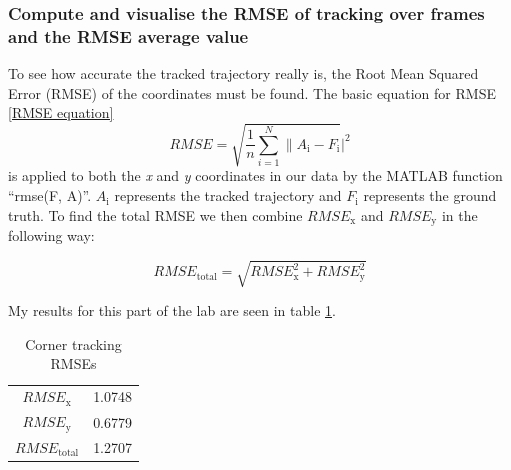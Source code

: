 \documentclass[11pt, letterpaper]{article}
\begin{document}
\subsubsection*{Compute and visualise the RMSE of tracking over frames and the RMSE average value}
To see how accurate the tracked trajectory really is, the Root Mean Squared Error (RMSE) of the coordinates must be found. The basic equation for RMSE \ref{RMSE equation}
\begin{equation}\label{RMSE equation}
  RMSE = 
  \sqrt{\frac{1}{n}
      \sum_{i=1}^{N}
          \|A_{\mathrm{i}} - F_{\mathrm{i}}}|^2    
\end{equation}
is applied to both the \textit{x} and \textit{y} coordinates in our data by the MATLAB function ``rmse(F, A)''. \begin{math}A_{\mathrm{i}}\end{math} represents the tracked trajectory and \begin{math}F_{\mathrm{i}}\end{math} represents the ground truth. To find the total RMSE we then combine \begin{math}RMSE_{\mathrm{x}}\end{math} and \begin{math}RMSE_{\mathrm{y}}\end{math} in the following way:

\begin{equation}
  RMSE_{\mathrm{total}}  =
  \sqrt{RMSE_{\mathrm{x}}^2 + RMSE_{\mathrm{y}}^2}
\end{equation}

My results for this part of the lab are seen in table \ref{tab:RMSEresults}.

\begin{table}[ht]
    \centering
    \begin{tabular}{cc}
         \begin{math}RMSE_{\mathrm{x}}\end{math} & 1.0748\\
         \begin{math}RMSE_{\mathrm{y}}\end{math} & 0.6779\\
         \begin{math}RMSE_{\mathrm{total}}\end{math} & 1.2707\\
    \end{tabular}
    \caption{Corner tracking RMSEs}
    \label{tab:RMSEresults}
\end{table}
\end{document}
